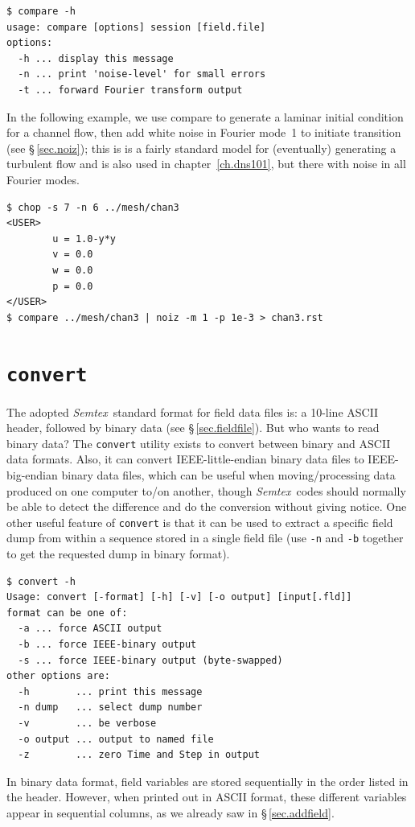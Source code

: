 \documentclass[11pt]{report}
\newcommand{\Semtex}{\emph{Semtex}} \newcommand{\Dog}{\emph{Dog}}
\begin{document}
{\small
\begin{verbatim}
$ compare -h
usage: compare [options] session [field.file]
options:
  -h ... display this message
  -n ... print 'noise-level' for small errors
  -t ... forward Fourier transform output
\end{verbatim}
}
%
In the following example, we use compare to generate a laminar initial
condition for a channel flow, then add white noise in Fourier mode~1
to initiate transition (see \S\,\ref{sec.noiz}); this is is a fairly
standard model for (eventually) generating a turbulent flow and is
also used in chapter~\ref{ch.dns101}, but there with noise in all
Fourier modes.  {\small
\begin{verbatim}
$ chop -s 7 -n 6 ../mesh/chan3
<USER>
        u = 1.0-y*y
        v = 0.0
        w = 0.0
        p = 0.0
</USER>
$ compare ../mesh/chan3 | noiz -m 1 -p 1e-3 > chan3.rst
\end{verbatim}
}

\section{\texttt{convert}}
\label{sec.convert}

The adopted \Semtex\ standard format for field data files is: a
10-line ASCII header, followed by binary data (see
\S\,\ref{sec.fieldfile}).  But who wants to read binary data?  The
\verb|convert| utility exists to convert between binary and ASCII data
formats.  Also, it can convert IEEE-little-endian binary data files to
IEEE-big-endian binary data files, which can be useful when
moving/processing data produced on one computer to/on another, though
\Semtex\ codes should normally be able to detect the difference and do
the conversion without giving notice.  One other useful feature of
\verb|convert| is that it can be used to extract a specific field dump
from within a sequence stored in a single field file (use \verb|-n|
and \verb|-b| together to get the requested dump in binary format).
{\small
\begin{verbatim}
$ convert -h
Usage: convert [-format] [-h] [-v] [-o output] [input[.fld]]
format can be one of:
  -a ... force ASCII output
  -b ... force IEEE-binary output
  -s ... force IEEE-binary output (byte-swapped)
other options are:
  -h        ... print this message
  -n dump   ... select dump number
  -v        ... be verbose
  -o output ... output to named file
  -z        ... zero Time and Step in output
\end{verbatim}
}
%
In binary data format, field variables are stored sequentially in the
order listed in the header.  However, when printed out in ASCII
format, these different variables appear in sequential columns, as we
already saw in \S\,\ref{sec.addfield}.
\end{document}
